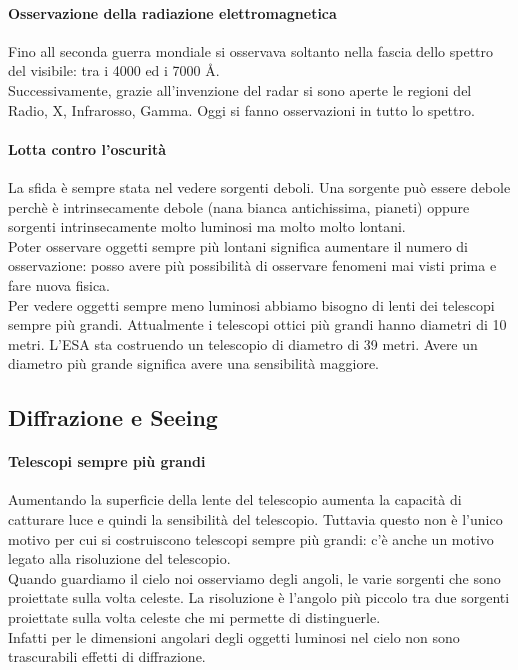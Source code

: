 \paragraph{Osservazione della radiazione elettromagnetica}%
Fino all seconda guerra mondiale si osservava soltanto nella fascia dello spettro del visibile: tra i 4000 ed i 7000 \AA.\\
Successivamente, grazie all'invenzione del radar si sono aperte le regioni del Radio, X, Infrarosso, Gamma. Oggi si fanno osservazioni in tutto lo spettro. 

\paragraph{Lotta contro l'oscurità}%
La sfida è sempre stata nel vedere sorgenti deboli. Una sorgente può essere debole perchè è intrinsecamente debole (nana bianca antichissima, pianeti) oppure sorgenti intrinsecamente molto luminosi ma molto molto lontani. \\
Poter osservare oggetti sempre più lontani significa aumentare il numero di osservazione: posso avere più possibilità di osservare fenomeni mai visti prima e fare nuova fisica.\\
Per vedere oggetti sempre meno luminosi abbiamo bisogno di lenti dei telescopi sempre più grandi. Attualmente i telescopi ottici più grandi hanno diametri di 10 metri. L'ESA sta costruendo un telescopio di diametro di 39 metri. Avere un diametro più grande significa avere una sensibilità maggiore.

\subsection{Diffrazione e Seeing}%
\paragraph{Telescopi sempre più grandi}%
Aumentando la superficie della lente del telescopio aumenta la capacità di catturare luce e quindi la sensibilità del telescopio. Tuttavia questo non è l'unico motivo per cui si costruiscono telescopi sempre più grandi: c'è anche un motivo legato alla risoluzione del telescopio.\\
Quando guardiamo il cielo noi osserviamo degli angoli, le varie sorgenti che sono proiettate sulla volta celeste. La risoluzione è l'angolo più piccolo tra due sorgenti proiettate sulla volta celeste che mi permette di distinguerle.\\
Infatti per le dimensioni angolari degli oggetti luminosi nel cielo non sono trascurabili effetti di diffrazione. 
